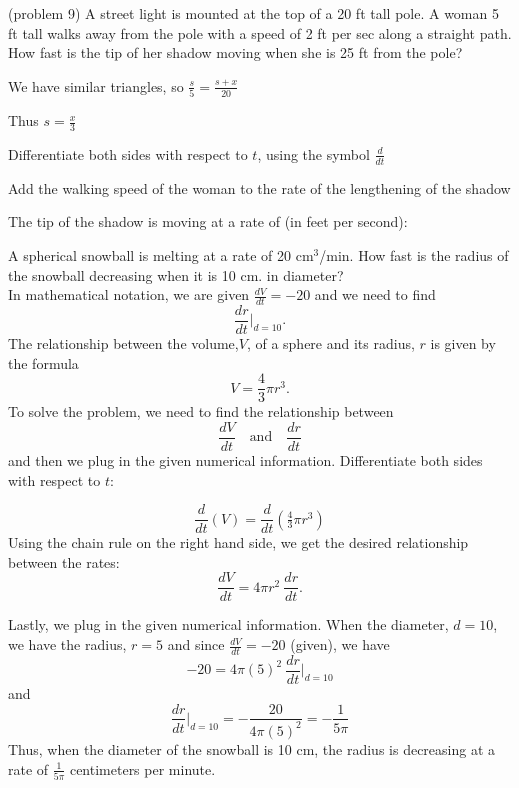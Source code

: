 \documentclass[handout]{ximera}
\begin{document}
\begin{problem}(problem 9)
A street light is mounted at the top of a 20 ft tall pole.  
A woman 5 ft tall walks away from the pole with a speed of 2 ft per sec along a straight path.  
How fast is the tip of her shadow moving when she is 25 ft from
the pole?
\begin{hint}
We have similar triangles, so $\frac{s}{5}=\frac{s+x}{20}$
\end{hint}
\begin{hint}
Thus $s=\frac{x}{3}$
\end{hint}
\begin{hint}
Differentiate both sides with respect to $t$, using the symbol $\frac{d}{dt}$
\end{hint}
\begin{hint}
Add the walking speed of the woman to the rate of the lengthening of the shadow
\end{hint}

The tip of the shadow is moving at a rate of (in feet per second):
\begin{multipleChoice}
\end{multipleChoice}
\end{problem}


\begin{example}[example 10]
A spherical snowball is melting at a rate of 20 cm$^3$/min. How fast is the radius of the snowball
decreasing when it is 10 cm. in diameter?\\
In mathematical notation, we are given $\frac{dV}{dt} = -20$ and we need to find
\[\frac{dr}{dt}\bigg|_{d = 10}.\]
The relationship between the volume,$V$, of a sphere and its radius, $r$ is given by the formula 
\[V = \frac43 \pi r^3.\]
To solve the problem, we need to find the relationship between 
\[\frac{dV}{dt} \quad \text{and} \quad \frac{dr}{dt}\]
and then we plug in the given numerical information.
Differentiate both sides with respect to $t$:




\[\frac{d}{dt} (V) = \frac{d}{dt}(\tfrac43 \pi r^3)\]
Using the chain rule on the right hand side, we get the desired relationship between the rates:
\[\frac{dV}{dt}  = 4\pi r^2 \  \frac{dr}{dt}.\]

Lastly, we plug in the given numerical information. When the diameter,  $d = 10$, we have the radius, $r = 5$ and since $\frac{dV}{dt}=-20$ (given), we have
\[-20  = 4\pi (5)^2 \ \frac{dr}{dt}\bigg|_{d = 10}\]
and
\[\frac{dr}{dt}\bigg|_{d = 10} = -\frac{20}{4\pi (5)^2} = -\frac{1}{5\pi} \]
Thus, when the diameter of the snowball is  10 cm, the radius is decreasing at a rate of $\frac{1}{5\pi}$ centimeters per minute.
\end{example}
\end{document}

